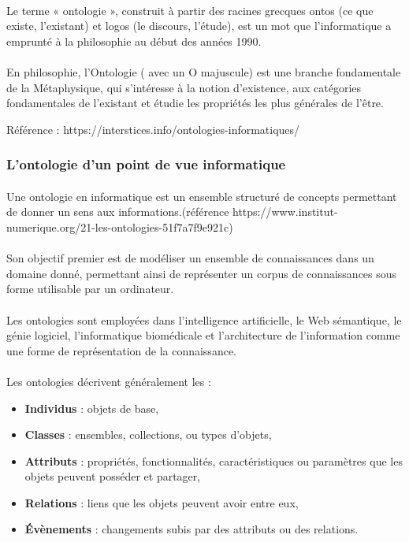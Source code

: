 \documentclass[12pt, a4paper, oneside]{book}
\begin{document}
\paragraph{}
Le terme « ontologie », construit à partir des racines grecques ontos (ce que existe, l'existant) et logos (le discours, l'étude), est un mot que l'informatique a emprunté à la philosophie au début des années 1990. 
\paragraph{}
En philosophie, l'Ontologie ( avec un O majuscule) est une branche fondamentale de la Métaphysique, qui s'intéresse à la notion d'existence, aux catégories fondamentales de l'existant et étudie les propriétés les plus générales de l'être.

Référence : https://interstices.info/ontologies-informatiques/

\subsubsection{L'ontologie d'un point de vue informatique}

\paragraph{}
Une ontologie en informatique est un ensemble structuré de concepts permettant de donner un sens aux informations.(référence https://www.institut-numerique.org/21-les-ontologies-51f7a7f9e921c)
\paragraph{}
 Son objectif premier est de modéliser un ensemble de connaissances dans un domaine donné, permettant ainsi de représenter un corpus de connaissances sous forme utilisable par un ordinateur.
\paragraph{}
Les ontologies sont employées dans l'intelligence artificielle, le Web sémantique, le génie logiciel, l'informatique biomédicale et l'architecture de l'information comme une forme de représentation de la connaissance. 
\paragraph{}
Les ontologies décrivent généralement les :
\begin{itemize}
\item \textbf{Individus} : objets de base,
\item \textbf{Classes} : ensembles, collections, ou types d'objets,
\item \textbf{Attributs} : propriétés, fonctionnalités, caractéristiques ou paramètres que les objets peuvent posséder et partager,
\item \textbf{Relations} : liens que les objets peuvent avoir entre eux,
\item \textbf{Évènements} : changements subis par des attributs ou des relations.
\end{itemize}
\end{document}
